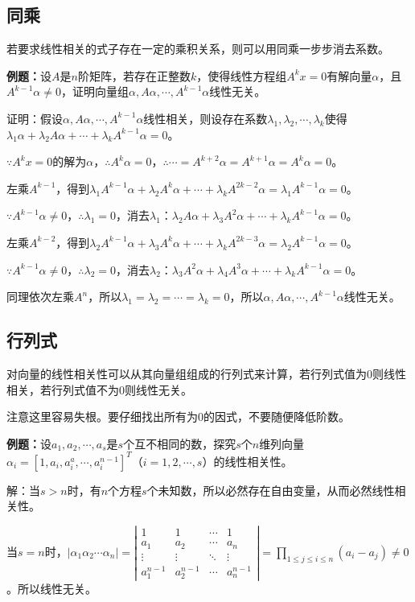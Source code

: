 \documentclass[UTF8, 12pt]{ctexart}
\begin{document}
\subsection{同乘}

若要求线性相关的式子存在一定的乘积关系，则可以用同乘一步步消去系数。

\textbf{例题：}设$A$是$n$阶矩阵，若存在正整数$k$，使得线性方程组$A^kx=0$有解向量$\alpha$，且$A^{k-1}\alpha\neq0$，证明向量组$\alpha,A\alpha,\cdots,A^{k-1}\alpha$线性无关。

证明：假设$\alpha,A\alpha,\cdots,A^{k-1}\alpha$线性相关，则设存在系数$\lambda_1,\lambda_2,\cdots,\lambda_k$使得$\lambda_1\alpha+\lambda_2A\alpha+\cdots+\lambda_kA^{k-1}\alpha=0$。

$\because A^kx=0$的解为$\alpha$，$\therefore A^k\alpha=0$，$\therefore\cdots=A^{k+2}\alpha=A^{k+1}\alpha=A^k\alpha=0$。

左乘$A^{k-1}$，得到$\lambda_1A^{k-1}\alpha+\lambda_2A^k\alpha+\cdots+\lambda_kA^{2k-2}\alpha=\lambda_1A^{k-1}\alpha=0$。

$\because A^{k-1}\alpha\neq0$，$\therefore\lambda_1=0$，消去$\lambda_1$：$\lambda_2A\alpha+\lambda_3A^2\alpha+\cdots+\lambda_kA^{k-1}\alpha=0$。

左乘$A^{k-2}$，得到$\lambda_2A^{k-1}\alpha+\lambda_3A^k\alpha+\cdots+\lambda_kA^{2k-3}\alpha=\lambda_2A^{k-1}\alpha=0$。

$\because A^{k-1}\alpha\neq0$，$\therefore\lambda_2=0$，消去$\lambda_2$：$\lambda_3A^2\alpha+\lambda_4A^3\alpha+\cdots+\lambda_kA^{k-1}\alpha=0$。

同理依次左乘$A^n$，所以$\lambda_1=\lambda_2=\cdots=\lambda_k=0$，所以$\alpha,A\alpha,\cdots,A^{k-1}\alpha$线性无关。

\subsection{行列式}

对向量的线性相关性可以从其向量组组成的行列式来计算，若行列式值为0则线性相关，若行列式值不为0则线性无关。

注意这里容易失根。要仔细找出所有为0的因式，不要随便降低阶数。

\textbf{例题：}设$a_1,a_2,\cdots,a_s$是$s$个互不相同的数，探究$s$个$n$维列向量$\alpha_i=[1,a_i,a_i^a,\cdots,a_i^{n-1}]^T$（$i=1,2,\cdots,s$）的线性相关性。

解：当$s>n$时，有$n$个方程$s$个未知数，所以必然存在自由变量，从而必然线性相关性。

当$s=n$时，$\vert\alpha_1 \alpha_2 \cdots \alpha_n\vert=\left|\begin{array}{cccc}
    1 & 1 & \cdots & 1 \\
    a_1 & a_2 & \cdots & a_n \\
    \vdots & \vdots & \ddots & \vdots \\
    a_1^{n-1} & a_2^{n-1} & \cdots & a_n^{n-1}
\end{array}\right|=\prod\limits_{1\leqslant j\leqslant i\leqslant n}(a_i-a_j)\neq0$。所以线性无关。
\end{document}

